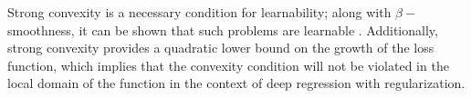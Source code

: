 Strong convexity is a necessary condition for learnability; along with $\beta-$smoothness, it can be shown that such problems are learnable \cite{shalev2014understanding}. Additionally, strong convexity provides a quadratic lower bound on the growth of the loss function, which implies that the convexity condition will not be violated in the local domain of the function in the context of deep regression with regularization.




